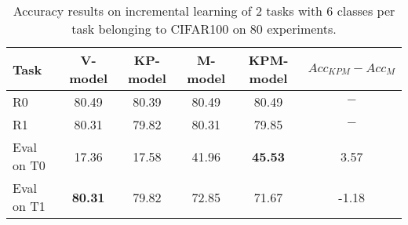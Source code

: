 \begin{table}[H]
\centering
\begin{tabular}{lccccc}
\toprule
Task  & V-model & KP-model & M-model & KPM-model & $Acc_{KPM}-Acc_{M}$ \\
\midrule
R0 & 80.49 & 80.39 & 80.49 & 80.49 & $-$ \\
R1 & 80.31 & 79.82 & 80.31 & 79.85 & $-$ \\

 \hline 
Eval on T0 & 17.36 & 17.58 & 41.96 & \textbf{45.53} & 3.57 \\
Eval on T1 & \textbf{80.31} & 79.82 & 72.85 & 71.67 & -1.18 \\
\bottomrule
\end{tabular}
\caption{Accuracy results on incremental learning of 2 tasks with 6 classes per task belonging to CIFAR100 on 80 experiments.}
\end{table}
